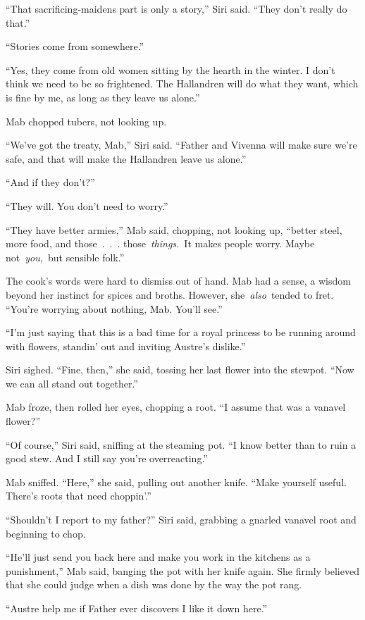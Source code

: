 “That sacrificing-maidens part is only a story,” Siri said. “They don’t really do that.”

“Stories come from somewhere.”

“Yes, they come from old women sitting by the hearth in the winter. I don’t think we need to be so frightened. The Hallandren will do what they want, which is fine by me, as long as they leave us alone.”

Mab chopped tubers, not looking up.

“We’ve got the treaty, Mab,” Siri said. “Father and Vivenna will make sure we’re safe, and that will make the Hallandren leave us alone.”

“And if they don’t?”

“They will. You don’t need to worry.”

“They have better armies,” Mab said, chopping, not looking up, “better steel, more food, and those~.~.~. those~\textit{things.}~It makes people worry. Maybe not~\textit{you,}~but sensible folk.”

The cook’s words were hard to dismiss out of hand. Mab had a sense, a wisdom beyond her instinct for spices and broths. However, she~\textit{also}~tended to fret. “You’re worrying about nothing, Mab. You’ll see.”

“I’m just saying that this is a bad time for a royal princess to be running around with flowers, standin’ out and inviting Austre’s dislike.”

Siri sighed. “Fine, then,” she said, tossing her last flower into the stewpot. “Now we can all stand out together.”

Mab froze, then rolled her eyes, chopping a root. “I assume that was a vanavel flower?”

“Of course,” Siri said, sniffing at the steaming pot. “I know better than to ruin a good stew. And I still say you’re overreacting.”

Mab sniffed. “Here,” she said, pulling out another knife. “Make yourself useful. There’s roots that need choppin’.”

“Shouldn’t I report to my father?” Siri said, grabbing a gnarled vanavel root and beginning to chop.

“He’ll just send you back here and make you work in the kitchens as a punishment,” Mab said, banging the pot with her knife again. She firmly believed that she could judge when a dish was done by the way the pot rang.

“Austre help me if Father ever discovers I like it down here.”

